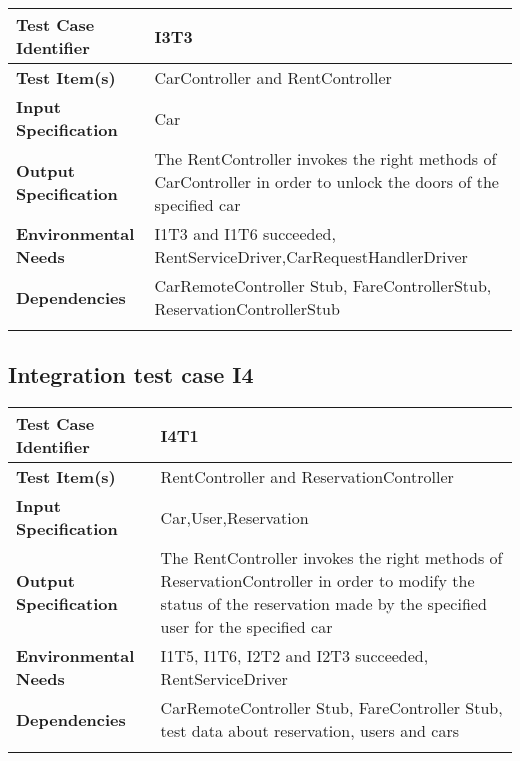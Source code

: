 \begin{center}
\begin{tabular*}
{\textwidth}
{l p{10.5cm}}

\hline
\textbf{Test Case Identifier} & I3T3 \\
\hline
\textbf{Test Item(s)} &  CarController and RentController  \\
\hline
\textbf{Input Specification} & Car\\
\hline
\textbf{Output Specification} & The RentController invokes the right methods of CarController in order to unlock the doors of the specified car\\
\hline
\textbf{Environmental Needs} & I1T3 and I1T6 succeeded, RentServiceDriver,CarRequestHandlerDriver\\
\hline
\textbf{Dependencies} &  CarRemoteController Stub, FareControllerStub, ReservationControllerStub\\
\hline
\newline
\newline
\end{tabular*}
\end{center}




\subsection{Integration test case I4}
\begin{center}
\begin{tabular*}
{\textwidth}
{l p{10.5cm}}

\hline
\textbf{Test Case Identifier} & I4T1 \\
\hline
\textbf{Test Item(s)} &  RentController and ReservationController   \\
\hline
\textbf{Input Specification} & Car,User,Reservation\\
\hline
\textbf{Output Specification} & The RentController invokes the right methods of ReservationController in order to modify the status of the reservation made by the specified user for the specified car\\
\hline
\textbf{Environmental Needs} & I1T5, I1T6, I2T2 and I2T3 succeeded, RentServiceDriver\\
\hline
\textbf{Dependencies} &  CarRemoteController Stub, FareController Stub,  test data about reservation, users and cars\\%
\hline
\newline
\newline
\end{tabular*}
\end{center}


